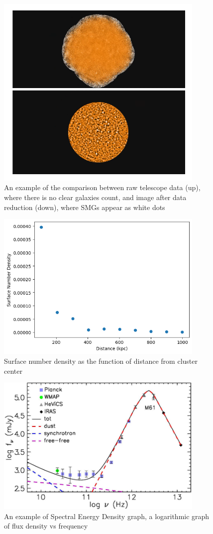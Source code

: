 \documentclass{article}
\begin{document}
\begin{figure}
    \centering
    \includegraphics[width=100mm]{reducevsunreduce.png}
    \caption{An example of the comparison between raw telescope data (up), where there is no clear galaxies count, and image after data reduction (down), where SMGs appear as white dots}
    \label{fig:reducevsunreduce}
\end{figure}

\begin{figure}
    \centering
    \includegraphics[width=100mm]{SNDensity.png}
    \caption{Surface number density as the function of distance from cluster center}
    \label{fig:sndensity}
\end{figure}

\begin{figure}
    \centering
    \includegraphics[width=100mm]{SED.png}
    \caption{An example of Spectral Energy Density graph, a logarithmic graph of flux density vs frequency}
    \label{fig:sedgraph}
\end{figure}
\end{document}
